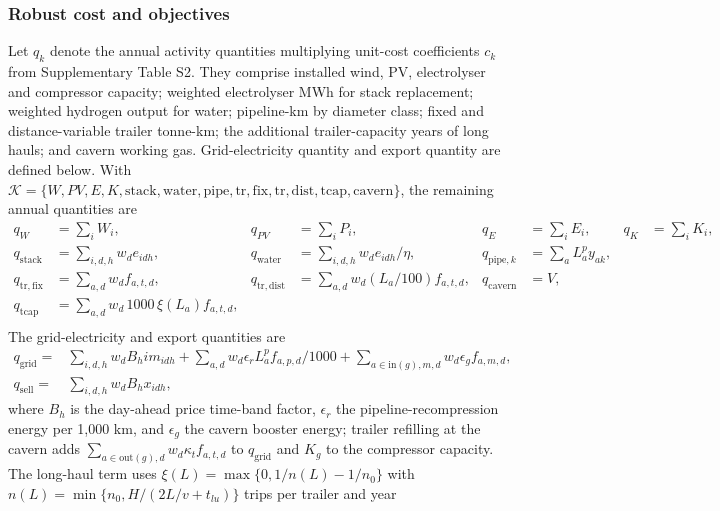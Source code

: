 \documentclass[11pt,a4paper]{article}
\begin{document}
\subsubsection{Robust cost and objectives}
Let $q_k$ denote the annual activity quantities multiplying unit-cost
coefficients $c_k$ from Supplementary Table S2. They comprise installed wind,
PV, electrolyser and compressor capacity; weighted electrolyser MWh for stack
replacement; weighted hydrogen output for water; pipeline-km by diameter class; fixed and
distance-variable trailer tonne-km; the additional trailer-capacity years of long hauls; and cavern
working gas. Grid-electricity
quantity and export quantity are defined below. With $\mathcal K=\{W,PV,E,K,
\mathrm{stack},\mathrm{water},\mathrm{pipe},\mathrm{tr,fix},\mathrm{tr,dist},\mathrm{tcap},
\mathrm{cavern}\}$, the remaining annual quantities are
\begin{equation}
\begin{aligned}
q_W&=\sum_iW_i, & q_{PV}&=\sum_iP_i, & q_E&=\sum_iE_i, & q_K&=\sum_iK_i,\\
q_{\mathrm{stack}}&=\sum_{i,d,h}w_de_{idh}, &
q_{\mathrm{water}}&=\sum_{i,d,h}w_de_{idh}/\eta, &
q_{\mathrm{pipe},k}&=\sum_aL_a^py_{ak},\\
q_{\mathrm{tr,fix}}&=\sum_{a,d}w_df_{a,t,d}, &
q_{\mathrm{tr,dist}}&=\sum_{a,d}w_d(L_a/100)f_{a,t,d}, &
q_{\mathrm{cavern}}&=V,\\
q_{\mathrm{tcap}}&=\sum_{a,d}w_d\,1000\,\xi(L_a)f_{a,t,d}, & & & & \\
\end{aligned}
\label{eq:s5_activity_quantities}
\end{equation}
The grid-electricity and export quantities are
\begin{equation}
\begin{aligned}
q_{\mathrm{grid}}={}&\sum_{i,d,h}w_dB_h im_{idh}
+\sum_{a,d}w_d\epsilon_r L^p_a f_{a,p,d}/1000
+\sum_{a\in\mathrm{in}(g),m,d}w_d\epsilon_g f_{a,m,d},\\
q_{\mathrm{sell}}={}&\sum_{i,d,h}w_dB_hx_{idh},
\end{aligned}
\label{eq:s5_grid_quantities}
\end{equation}
where $B_h$ is the day-ahead price time-band factor, $\epsilon_r$ the
pipeline-recompression energy per 1,000 km, and $\epsilon_g$ the cavern
booster energy; trailer refilling at the cavern adds $\sum_{a\in\mathrm{out}(g),d}w_d\kappa_tf_{a,t,d}$ to
$q_{\mathrm{grid}}$ and $K_g$ to the compressor capacity. The long-haul term uses
$\xi(L)=\max\{0,1/n(L)-1/n_0\}$ with $n(L)=\min\{n_0,H/(2L/v+t_{lu})\}$ trips per trailer and year
\end{document}
